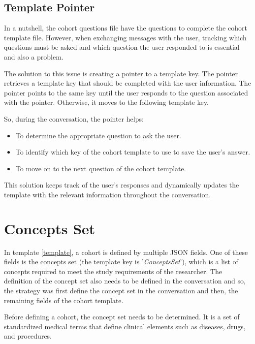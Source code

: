 \subsection{Template Pointer}

In a nutshell, the cohort questions file have the questions to complete the cohort template file. However, when exchanging messages with the user, tracking which questions must be asked and which question the user responded to is essential and also a problem.

The solution to this issue is creating a pointer to a template key. The pointer retrieves a template key that should be completed with the user information. The pointer points to the same key until the user responds to the question associated with the pointer. Otherwise, it moves to the following template key.

So, during the conversation, the pointer helps:

\begin{itemize}
  \item To determine the appropriate question to ask the user.
  \item To identify which key of the cohort template to use to save the user's answer.
  \item To move on to the next question of the cohort template.
\end{itemize}

This solution keeps track of the user's responses and dynamically updates the template with the relevant information throughout the conversation.


\section{Concepts Set}


In template \ref{template}, a cohort is defined by multiple JSON fields. One of these fields is the concepts set (the template key is '\textit{ConceptsSet}'), which is a list of concepts required to meet the study requirements of the researcher. The definition of the concept set also needs to be defined in the conversation and so, the strategy was first define the concept set in the conversation and then, the remaining fields of the cohort template.

Before defining a cohort, the concept set needs to be determined. It is a set of standardized medical terms that define clinical elements such as diseases, drugs, and procedures.

